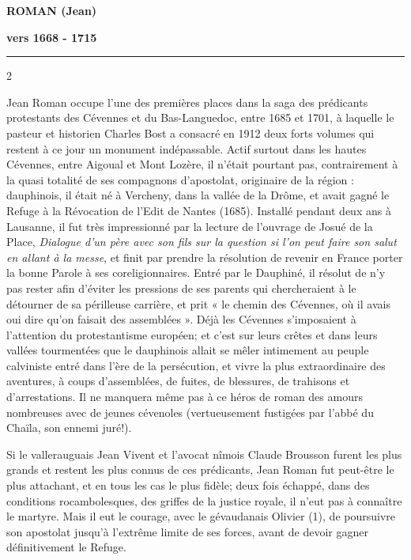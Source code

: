 

\begin{center}
  {\fontsize{12}{13}\selectfont\bfseries ROMAN (Jean)\par}
  {\fontsize{12}{13}\selectfont\bfseries vers 1668 - 1715\par}
  \vspace{0.10em}
  \rule{3.8cm}{0.45pt}
\end{center}

\vspace{0.45em}

{\fontsize{9.65}{11.05}\selectfont
\begin{multicols}{2}

Jean Roman occupe l’une des premières places dans la saga des prédicants protestants des Cévennes et du Bas-Languedoc, entre 1685 et 1701, à laquelle le pasteur et historien Charles Bost a consacré en 1912 deux forts volumes qui restent à ce jour un monument indépassable. Actif surtout dans les hautes Cévennes, entre Aigoual et Mont Lozère, il n’était pourtant pas, contrairement à la quasi totalité de ses compagnons d’apostolat, originaire de la région : dauphinois, il était né à Vercheny, dans la vallée de la Drôme, et avait gagné le Refuge à la Révocation de l’Edit de Nantes (1685). Installé pendant deux ans à Lausanne, il fut très impressionné par la lecture de l’ouvrage de Josué de la Place, \textit{Dialogue d’un père avec son fils sur la question si l’on peut faire son salut en allant à la messe}, et finit par prendre la résolution de revenir en France porter la bonne Parole à ses coreligionnaires. Entré par le Dauphiné, il résolut de n’y pas rester afin d’éviter les pressions de ses parents qui chercheraient à le détourner de sa périlleuse carrière, et prit « le chemin des Cévennes, où il avais oui dire qu’on faisait des assemblées ». Déjà les Cévennes s’imposaient à l’attention du protestantisme européen; et c’est sur leurs crêtes et dans leurs vallées tourmentées que le dauphinois allait se mêler intimement au peuple calviniste entré dans l’ère de la persécution, et vivre la plus extraordinaire des aventures, à coups d’assemblées, de fuites, de blessures, de trahisons et d’arrestations. Il ne manquera même pas à ce héros de roman des amours nombreuses avec de jeunes cévenoles (vertueusement fustigées par l’abbé du Chaïla, son ennemi juré!).

Si le vallerauguais Jean Vivent et l’avocat nîmois Claude Brousson furent les plus grands et restent les plus connus de ces prédicants, Jean Roman fut peut-être le plus attachant, et en tous les cas le plus fidèle; deux fois échappé, dans des conditions rocambolesques, des griffes de la justice royale, il n’eut pas à connaître le martyre. Mais il eut le courage, avec le gévaudanais Olivier (1), de poursuivre son apostolat jusqu’à l’extrême limite de ses forces, avant de devoir gagner définitivement le Refuge.


\end{multicols}}
